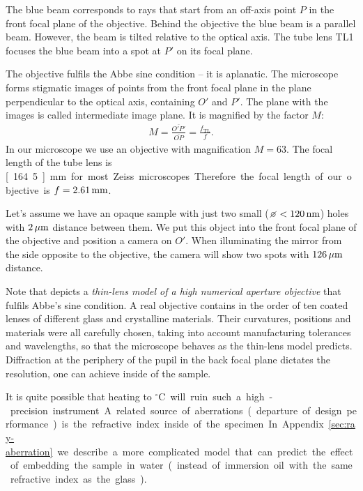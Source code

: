 The blue beam corresponds to rays that start from an off-axis point
$P$ in the front focal plane of the objective. Behind the objective
the blue beam is a parallel beam. However, the beam is tilted relative
to the optical axis. The tube lens TL1 focuses the blue beam into a
spot at $P'$ on its focal plane.

The objective fulfils the Abbe sine condition -- it is aplanatic. The
microscope forms stigmatic images of points from the front focal plane
in the plane perpendicular to the optical axis, containing $O'$ and
$P'$. The plane with the images is called intermediate image plane. It
is magnified by the factor $M$:
\begin{align}
  M=\frac{\overline{O'P'}}{\overline{OP}}=\frac{f_\textrm{TL}}{f}.
\end{align}
In our microscope we use an objective with magnification $M=63$. The
focal length of the tube lens is \unit[164.5]{mm} for most Zeiss
microscopes. Therefore the focal length of our objective is
$f=\unit[2.61]{mm}$.

Let's assume we have an opaque sample with just two small
($\diameter<\unit[120]{nm}$) holes with $\unit[2]{\mu m}$ distance
between them.  We put this object into the front focal plane of the
objective and position a camera on $O'$. When illuminating the mirror
from the side opposite to the objective, the camera will show two
spots with $\unit[126]{\mu m}$ distance.


Note that  depicts a \emph{thin-lens
  model of a high numerical aperture objective} that fulfils Abbe's
sine condition. A real objective contains in the order of ten coated
lenses of different glass and crystalline materials. Their curvatures,
positions and materials were all carefully chosen, taking into account
manufacturing tolerances and wavelengths, so that the microscope
behaves as the thin-lens model predicts. Diffraction at the periphery
of the pupil in the back focal plane dictates the resolution, one can
achieve inside of the sample.

It is quite possible that heating to \unit[37]{${}^\circ$C} will ruin
such a high-precision instrument. A related source of aberrations
(departure of design performance) is the refractive index inside of
the specimen. In Appendix~\ref{sec:ray-aberration} we describe a more
complicated model that can predict the effect of embedding the sample
in water (instead of immersion oil with the same refractive index as
the glass).

